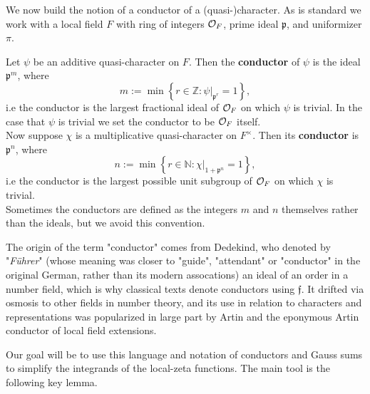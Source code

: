 \documentclass[11pt, x11names, openany]{book}
\newcommand{\nn}{\mathbb{N}}
\newcommand{\zz}{\mathbb{Z}}
\newcommand{\pp}{\mathfrak{p}}
\newcommand{\frakf}{\mathfrak{f}}
\newcommand{\set}[1]{\left\{ #1 \right\}}
\begin{document}
We now build the notion of a conductor of a (quasi-)character. As is standard we work with a local field $F$ with ring of integers $\mathcal{O}_F$, prime ideal $\pp$, and  uniformizer $\pi$.
\begin{defn}
\label{def: conductor}
Let $\psi$ be an additive quasi-character on $F$. Then the \textbf{conductor} of $\psi$ is the ideal $\pp^m$, where 
\begin{equation*}
    m := \min \set{r \in \zz : \psi \vert_{\pp^r} = 1},
\end{equation*}
i.e the conductor is the largest fractional ideal of $\mathcal{O}_F$ on which $\psi$ is trivial. In the case that $\psi$ is trivial we set the conductor to be $\mathcal{O}_F$ itself.\\
Now suppose $\chi$ is a multiplicative quasi-character on $F^\times$. Then its \textbf{conductor} is $\pp^n$, where
\begin{equation*}
    n := \min \set{r \in \nn : \chi \vert_{1 + \pp^n} = 1},
\end{equation*}
i.e the conductor is the largest possible unit subgroup of $\mathcal{O}_F$ on which $\chi$ is trivial.\\
Sometimes the conductors are defined as the integers $m$ and $n$ themselves rather than the ideals, but we avoid this convention.
\end{defn}
\begin{remark}[Terminology]
    The origin of the term "conductor" comes from Dedekind, who denoted by "\textit{F\"uhrer}" (whose meaning was closer to "guide", "attendant" or "conductor" in the original German, rather than its modern assocations) an ideal of an order in a number field, which is why classical texts denote conductors using $\frakf$. It drifted via osmosis to other fields in number theory, and its use in relation to characters and representations was popularized in large part by Artin and the eponymous Artin conductor of local field extensions.
\end{remark}

Our goal will be to use this language and notation of conductors and Gauss sums to simplify the integrands of the local-zeta functions. The main tool is the following key lemma.
\end{document}
